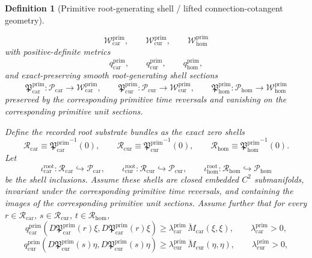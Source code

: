 \documentclass[11pt]{article}
\newcommand{\TensorRootSpace}{\mathcal R_{\mathrm{car}}}
\newcommand{\CurRootSpace}{\mathcal R_{\mathrm{cur}}}
\newcommand{\HomRootSpace}{\mathcal R_{\mathrm{hom}}}
\newcommand{\TensorPrimitiveSpace}{\mathcal P_{\mathrm{car}}}
\newcommand{\CurPrimitiveSpace}{\mathcal P_{\mathrm{cur}}}
\newcommand{\HomPrimitiveSpace}{\mathcal P_{\mathrm{hom}}}
\newcommand{\TensorPrimitiveSpaceMetric}{\breve M_{\mathrm{car}}}
\newcommand{\CurPrimitiveSpaceMetric}{\breve M_{\mathrm{cur}}}
\newcommand{\TensorPrimitiveTarget}{\mathcal W_{\mathrm{car}}^{\mathrm{prim}}}
\newcommand{\CurPrimitiveTarget}{\mathcal W_{\mathrm{cur}}^{\mathrm{prim}}}
\newcommand{\HomPrimitiveTarget}{\mathcal W_{\mathrm{hom}}^{\mathrm{prim}}}
\newcommand{\TensorPrimitiveTargetMetric}{q_{\mathrm{car}}^{\mathrm{prim}}}
\newcommand{\CurPrimitiveTargetMetric}{q_{\mathrm{cur}}^{\mathrm{prim}}}
\newcommand{\HomPrimitiveTargetMetric}{q_{\mathrm{hom}}^{\mathrm{prim}}}
\newcommand{\TensorPrimitiveSection}{\mathfrak P_{\mathrm{car}}^{\mathrm{prim}}}
\newcommand{\CurPrimitiveSection}{\mathfrak P_{\mathrm{cur}}^{\mathrm{prim}}}
\newcommand{\HomPrimitiveSection}{\mathfrak P_{\mathrm{hom}}^{\mathrm{prim}}}
\newcommand{\TensorPrimitiveGap}{\lambda_{\mathrm{car}}^{\mathrm{prim}}}
\newcommand{\CurPrimitiveGap}{\lambda_{\mathrm{cur}}^{\mathrm{prim}}}
\newcommand{\TensorRootInc}{\iota_{\mathrm{car}}^{\mathrm{root}}}
\newcommand{\CurRootInc}{\iota_{\mathrm{cur}}^{\mathrm{root}}}
\newcommand{\HomRootInc}{\iota_{\mathrm{hom}}^{\mathrm{root}}}
\newtheorem{definition}{Definition}
\begin{document}
\begin{definition}[Primitive root-generating shell / lifted connection-cotangent geometry]
\begin{enumerate}
    \[
    \TensorPrimitiveTarget,\qquad
    \CurPrimitiveTarget,\qquad
    \HomPrimitiveTarget
    \]
    with positive-definite metrics
    \[
    \TensorPrimitiveTargetMetric,\qquad
    \CurPrimitiveTargetMetric,\qquad
    \HomPrimitiveTargetMetric,
    \]
    and exact-preserving smooth root-generating shell sections
    \[
    \TensorPrimitiveSection:\TensorPrimitiveSpace\to\TensorPrimitiveTarget,\qquad
    \CurPrimitiveSection:\CurPrimitiveSpace\to\CurPrimitiveTarget,\qquad
    \HomPrimitiveSection:\HomPrimitiveSpace\to\HomPrimitiveTarget
    \]
    preserved by the corresponding primitive time reversals and vanishing on the corresponding primitive unit sections.

    Define the recorded root substrate bundles as the exact zero shells
    \begin{equation}
    \TensorRootSpace\equiv{\TensorPrimitiveSection}^{-1}(0),\qquad
    \CurRootSpace\equiv{\CurPrimitiveSection}^{-1}(0),\qquad
    \HomRootSpace\equiv{\HomPrimitiveSection}^{-1}(0).
    \label{eq:root_shells_from_primitive}
    \end{equation}
    Let
    \begin{equation}
    \TensorRootInc:\TensorRootSpace\hookrightarrow\TensorPrimitiveSpace,\qquad
    \CurRootInc:\CurRootSpace\hookrightarrow\CurPrimitiveSpace,\qquad
    \HomRootInc:\HomRootSpace\hookrightarrow\HomPrimitiveSpace
    \label{eq:root_inclusions}
    \end{equation}
    be the shell inclusions. Assume these shells are closed embedded \(C^2\) submanifolds, invariant under the corresponding primitive time reversals, and containing the images of the corresponding primitive unit sections. Assume further that for every \(r\in\TensorRootSpace\), \(s\in\CurRootSpace\), \(t\in\HomRootSpace\),
    \begin{equation}
    \TensorPrimitiveTargetMetric\!\left(D\TensorPrimitiveSection(r)\xi,D\TensorPrimitiveSection(r)\xi\right)
    \ge
    \TensorPrimitiveGap\,\TensorPrimitiveSpaceMetric(\xi,\xi),
    \qquad
    \TensorPrimitiveGap>0,
    \label{eq:primitive_gap_car}
    \end{equation}
    \begin{equation}
    \CurPrimitiveTargetMetric\!\left(D\CurPrimitiveSection(s)\eta,D\CurPrimitiveSection(s)\eta\right)
    \ge
    \CurPrimitiveGap\,\CurPrimitiveSpaceMetric(\eta,\eta),
    \qquad
    \CurPrimitiveGap>0,
    \label{eq:primitive_gap_cur}
    \end{equation}
    \begin{equation}

\end{equation}
\end{enumerate}
\end{definition}
\end{document}
